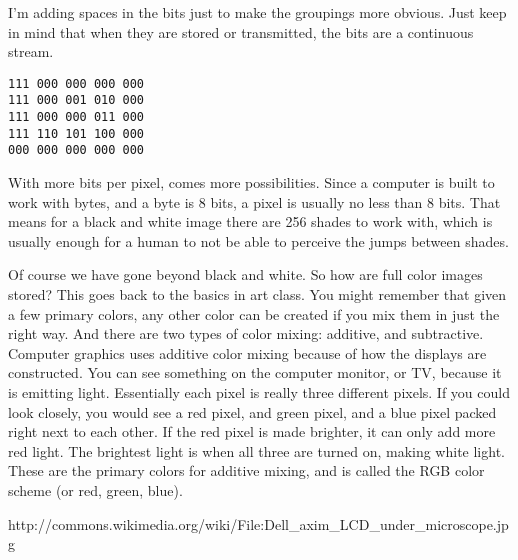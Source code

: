\begin{center}\end{center}

I'm adding spaces in the bits just to make the groupings more obvious. Just keep in mind that when they are stored or transmitted, the bits are a continuous stream.

\begin{verbatim}
111 000 000 000 000
111 000 001 010 000   
111 000 000 011 000   
111 110 101 100 000   
000 000 000 000 000
\end{verbatim}

With more bits per pixel, comes more possibilities. Since a computer is built to work with bytes, and a byte is 8 bits, a pixel is usually no less than 8 bits. That means for a black and white image there are 256 shades to work with, which is usually enough for a human to not be able to perceive the jumps between shades.\\

\begin{center}\end{center}

Of course we have gone beyond black and white. So how are full color images stored? This goes back to the basics in art class. You might remember that given a few primary colors, any other color can be created if you mix them in just the right way. And there are two types of color mixing: additive, and subtractive.\\

Computer graphics uses additive color mixing because of how the displays are constructed. You can see something on the computer monitor, or TV, because it is emitting light. Essentially each pixel is really three different pixels. If you could look closely, you would see a red pixel, and green pixel, and a blue pixel packed right next to each other. If the red pixel is made brighter, it can only add more red light. The brightest light is when all three are turned on, making white light. These are the primary colors for additive mixing, and is called the RGB color scheme (or red, green, blue).\\

\begin{center}\end{center}
\begin{center}
	
http://commons.wikimedia.org/wiki/File:Dell\_axim\_LCD\_under\_microscope.jpg
\end{center}

